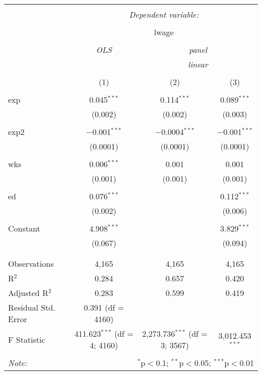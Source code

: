 
\begin{table}[!htbp] \centering 
  \caption{} 
  \label{} 
\begin{tabular}{@{\extracolsep{5pt}}lccc} 
\\[-1.8ex]\hline 
\hline \\[-1.8ex] 
 & \multicolumn{3}{c}{\textit{Dependent variable:}} \\ 
\cline{2-4} 
\\[-1.8ex] & \multicolumn{3}{c}{lwage} \\ 
\\[-1.8ex] & \textit{OLS} & \multicolumn{2}{c}{\textit{panel}} \\ 
 & \textit{} & \multicolumn{2}{c}{\textit{linear}} \\ 
\\[-1.8ex] & (1) & (2) & (3)\\ 
\hline \\[-1.8ex] 
 exp & 0.045$^{***}$ & 0.114$^{***}$ & 0.089$^{***}$ \\ 
  & (0.002) & (0.002) & (0.003) \\ 
  & & & \\ 
 exp2 & $-$0.001$^{***}$ & $-$0.0004$^{***}$ & $-$0.001$^{***}$ \\ 
  & (0.0001) & (0.0001) & (0.0001) \\ 
  & & & \\ 
 wks & 0.006$^{***}$ & 0.001 & 0.001 \\ 
  & (0.001) & (0.001) & (0.001) \\ 
  & & & \\ 
 ed & 0.076$^{***}$ &  & 0.112$^{***}$ \\ 
  & (0.002) &  & (0.006) \\ 
  & & & \\ 
 Constant & 4.908$^{***}$ &  & 3.829$^{***}$ \\ 
  & (0.067) &  & (0.094) \\ 
  & & & \\ 
\hline \\[-1.8ex] 
Observations & 4,165 & 4,165 & 4,165 \\ 
R$^{2}$ & 0.284 & 0.657 & 0.420 \\ 
Adjusted R$^{2}$ & 0.283 & 0.599 & 0.419 \\ 
Residual Std. Error & 0.391 (df = 4160) &  &  \\ 
F Statistic & 411.623$^{***}$ (df = 4; 4160) & 2,273.736$^{***}$ (df = 3; 3567) & 3,012.453$^{***}$ \\ 
\hline 
\hline \\[-1.8ex] 
\textit{Note:}  & \multicolumn{3}{r}{$^{*}$p$<$0.1; $^{**}$p$<$0.05; $^{***}$p$<$0.01} \\ 
\end{tabular} 
\end{table} 
